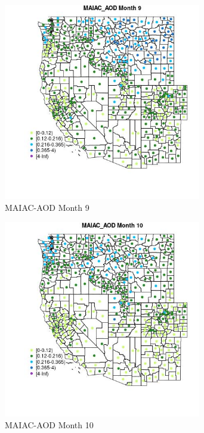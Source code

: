 \begin{figure} 
\centering  
\includegraphics[width=0.77\textwidth]{Code_Outputs/df_report_ML_predictors_CountyCentroid_Locations_Dates_2008-01-01to2018-12-31_MapObsMo9MAIAC_AOD.jpg} 
\caption{\label{fig:df_report_ML_predictors_CountyCentroid_Locations_Dates_2008-01-01to2018-12-31MapObsMo9MAIAC_AOD}MAIAC-AOD Month 9} 
\end{figure} 
 

\clearpage 

\begin{figure} 
\centering  
\includegraphics[width=0.77\textwidth]{Code_Outputs/df_report_ML_predictors_CountyCentroid_Locations_Dates_2008-01-01to2018-12-31_MapObsMo10MAIAC_AOD.jpg} 
\caption{\label{fig:df_report_ML_predictors_CountyCentroid_Locations_Dates_2008-01-01to2018-12-31MapObsMo10MAIAC_AOD}MAIAC-AOD Month 10} 
\end{figure} 
 

